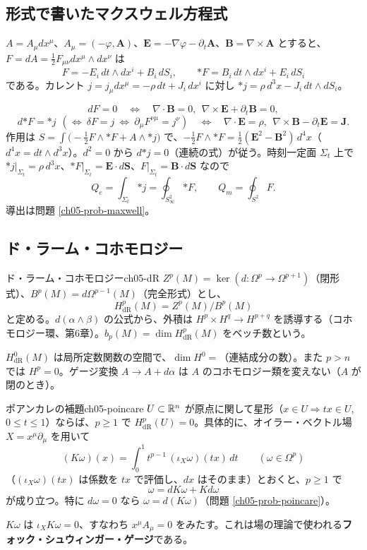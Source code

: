 \subsection{形式で書いたマクスウェル方程式}
$A=A_\mu dx^\mu$、$A_\mu=(-\varphi,\bm A)$、$\bm E=-\nabla\varphi-\partial_t\bm A$、$\bm B=\nabla\times\bm A$ とすると、$F=dA=\tfrac12F_{\mu\nu}dx^\mu\wedge dx^\nu$ は
\[
F=-E_i\,dt\wedge dx^i+B_i\,dS_i,\qquad {*F}=B_i\,dt\wedge dx^i+E_i\,dS_i
\]
である。カレント $j=j_\mu dx^\mu=-\rho\,dt+J_i\,dx^i$ に対し ${*j}=\rho\,d^3x-J_i\,dt\wedge dS_i$。

\begin{physbox}
\[
dF=0\quad\Longleftrightarrow\quad\nabla\cdot\bm B=0,\ \ \nabla\times\bm E+\partial_t\bm B=0,
\]
\[
d{*F}={*j}\ \ (\Longleftrightarrow\ \delta F=j\ \Longleftrightarrow\ \partial_\mu F^{\nu\mu}=j^\nu)\quad\Longleftrightarrow\quad\nabla\cdot\bm E=\rho,\ \ \nabla\times\bm B-\partial_t\bm E=\bm J .
\]
作用は $S=\int\bigl(-\tfrac12F\wedge{*F}+A\wedge{*j}\bigr)$ で、$-\tfrac12F\wedge{*F}=\tfrac12(\bm E^2-\bm B^2)\,d^4x$（$d^4x=dt\wedge d^3x$）。$d^2=0$ から $d{*j}=0$（連続の式）が従う。時刻一定面 $\Sigma_t$ 上で ${*j}|_{\Sigma_t}=\rho\,d^3x$、${*F}|_{\Sigma_t}=\bm E\cdot d\bm S$、$F|_{\Sigma_t}=\bm B\cdot d\bm S$ なので
\[
Q_e=\int_{\Sigma_t}{*j}=\oint_{S^2_\infty}{*F},\qquad Q_m=\oint_{S^2}F .
\]
導出は問題 \ref{ch05-prob-maxwell}。
\end{physbox}

\subsection{ド・ラーム・コホモロジー}
\begin{mydef}{ド・ラーム・コホモロジー}{ch05-dR}
$Z^p(M)=\ker(d\colon\Omega^p\to\Omega^{p+1})$（閉形式）、$B^p(M)=d\Omega^{p-1}(M)$（完全形式）とし、
\[
H^p_{\mathrm{dR}}(M)=Z^p(M)/B^p(M)
\]
と定める。$d(\alpha\wedge\beta)$ の公式から、外積は $H^p\times H^q\to H^{p+q}$ を誘導する（コホモロジー環、第6章）。$b_p(M)=\dim H^p_{\mathrm{dR}}(M)$ をベッチ数という。
\end{mydef}
$H^0_{\mathrm{dR}}(M)$ は局所定数関数の空間で、$\dim H^0=$（連結成分の数）。また $p>n$ では $H^p=0$。ゲージ変換 $A\to A+d\alpha$ は $A$ のコホモロジー類を変えない（$A$ が閉のとき）。

\begin{mythm}{ポアンカレの補題}{ch05-poincare}
$U\subset\mathbb{R}^n$ が原点に関して星形（$x\in U\Rightarrow tx\in U$, $0\le t\le1$）ならば、$p\ge1$ で $H^p_{\mathrm{dR}}(U)=0$。具体的に、オイラー・ベクトル場 $X=x^\mu\partial_\mu$ を用いて
\[
(K\omega)(x)=\int_0^1 t^{p-1}\,(\iota_X\omega)(tx)\,dt\qquad(\omega\in\Omega^p)
\]
（$(\iota_X\omega)(tx)$ は係数を $tx$ で評価し、$dx$ はそのまま）とおくと、$p\ge1$ で
\[
\omega=dK\omega+Kd\omega
\]
が成り立つ。特に $d\omega=0$ なら $\omega=d(K\omega)$（問題 \ref{ch05-prob-poincare}）。
\end{mythm}
$K\omega$ は $\iota_X K\omega=0$、すなわち $x^\mu A_\mu=0$ をみたす。これは場の理論で使われる\textbf{フォック・シュウィンガー・ゲージ}である。

